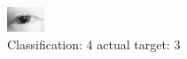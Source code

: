 \begin{figure}[h!]
\begin{center}
\includegraphics[width=0.60\columnwidth]{figures/ID41_class_4_target_3.png}
\end{center}
\caption{ Classification: 4 actual target: 3}
\label{fig:ID41_class_4_target_3}
\end{figure}
